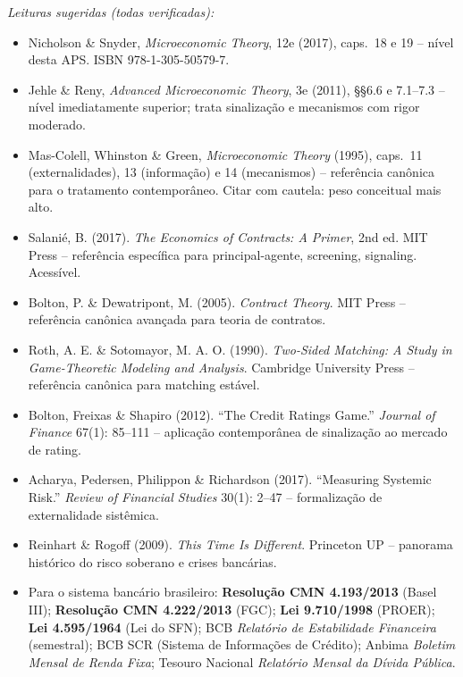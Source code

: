 \documentclass[11pt,addpoints]{exam}
\begin{document}
\vspace{1em}
\begin{contextbox}
\small
\textit{Leituras sugeridas (todas verificadas):}
\begin{itemize}[noitemsep,topsep=0pt]
\item Nicholson \& Snyder, \textit{Microeconomic Theory}, 12e (2017), caps.~18 e 19 -- nível desta APS. ISBN 978-1-305-50579-7.
\item Jehle \& Reny, \textit{Advanced Microeconomic Theory}, 3e (2011), §§6.6 e 7.1--7.3 -- nível imediatamente superior; trata sinalização e mecanismos com rigor moderado.
\item Mas-Colell, Whinston \& Green, \textit{Microeconomic Theory} (1995), caps.~11 (externalidades), 13 (informação) e 14 (mecanismos) -- referência canônica para o tratamento contemporâneo. Citar com cautela: peso conceitual mais alto.
\item Salanié, B. (2017). \textit{The Economics of Contracts: A Primer}, 2nd ed. MIT Press -- referência específica para principal-agente, screening, signaling. Acessível.
\item Bolton, P. \& Dewatripont, M. (2005). \textit{Contract Theory}. MIT Press -- referência canônica avançada para teoria de contratos.
\item Roth, A. E. \& Sotomayor, M. A. O. (1990). \textit{Two-Sided Matching: A Study in Game-Theoretic Modeling and Analysis}. Cambridge University Press -- referência canônica para matching estável.
\item Bolton, Freixas \& Shapiro (2012). ``The Credit Ratings Game.'' \textit{Journal of Finance} 67(1): 85--111 -- aplicação contemporânea de sinalização ao mercado de rating.
\item Acharya, Pedersen, Philippon \& Richardson (2017). ``Measuring Systemic Risk.'' \textit{Review of Financial Studies} 30(1): 2--47 -- formalização de externalidade sistêmica.
\item Reinhart \& Rogoff (2009). \textit{This Time Is Different}. Princeton UP -- panorama histórico do risco soberano e crises bancárias.
\item Para o sistema bancário brasileiro: \textbf{Resolução CMN 4.193/2013} (Basel III); \textbf{Resolução CMN 4.222/2013} (FGC); \textbf{Lei 9.710/1998} (PROER); \textbf{Lei 4.595/1964} (Lei do SFN); BCB \emph{Relatório de Estabilidade Financeira} (semestral); BCB SCR (Sistema de Informações de Crédito); Anbima \emph{Boletim Mensal de Renda Fixa}; Tesouro Nacional \emph{Relatório Mensal da Dívida Pública}.
\end{itemize}
\end{contextbox}
\end{document}
